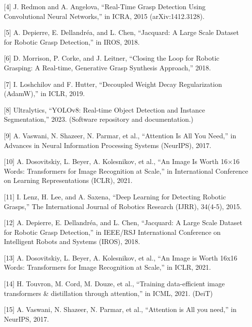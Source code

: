 [4] J. Redmon and A. Angelova, “Real-Time Grasp Detection Using Convolutional Neural Networks,” in ICRA, 2015 (arXiv:1412.3128).

[5] A. Depierre, E. Dellandréa, and L. Chen, “Jacquard: A Large Scale Dataset for Robotic Grasp Detection,” in IROS, 2018.

[6] D. Morrison, P. Corke, and J. Leitner, “Closing the Loop for Robotic Grasping: A Real-time, Generative Grasp Synthesis Approach,” 2018.

[7] I. Loshchilov and F. Hutter, “Decoupled Weight Decay Regularization (AdamW),” in ICLR, 2019.

[8] Ultralytics, “YOLOv8: Real-time Object Detection and Instance Segmentation,” 2023. (Software repository and documentation.)

[9] A. Vaswani, N. Shazeer, N. Parmar, et al., “Attention Is All You Need,” in Advances in Neural Information Processing Systems (NeurIPS), 2017.

[10] A. Dosovitskiy, L. Beyer, A. Kolesnikov, et al., “An Image Is Worth 16×16 Words: Transformers for Image Recognition at Scale,” in International Conference on Learning Representations (ICLR), 2021.

[11] I. Lenz, H. Lee, and A. Saxena, “Deep Learning for Detecting Robotic Grasps,” The International Journal of Robotics Research (IJRR), 34(4-5), 2015.

[12] A. Depierre, E. Dellandréa, and L. Chen, “Jacquard: A Large Scale Dataset for Robotic Grasp Detection,” in IEEE/RSJ International Conference on Intelligent Robots and Systems (IROS), 2018.

[13] A. Dosovitskiy, L. Beyer, A. Kolesnikov, et al., “An Image is Worth 16x16 Words: Transformers for Image Recognition at Scale,” in ICLR, 2021.

[14] H. Touvron, M. Cord, M. Douze, et al., “Training data-efficient image transformers & distillation through attention,” in ICML, 2021. (DeiT)

[15] A. Vaswani, N. Shazeer, N. Parmar, et al., “Attention is All you need,” in NeurIPS, 2017.
